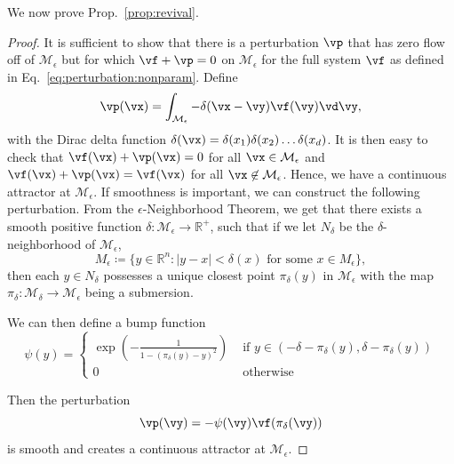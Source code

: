 \documentclass{article} %
\newcounter{ct}
\newcommand{\reals}{\mathbb{R}}
\newcommand{\manifold}{\mathcal{M}}
\theoremstyle{definition}
\theoremstyle{remark}
\newtheorem{remark}{Remark}
\begin{document}
We now prove  Prop.~\ref{prop:revival}.
\begin{proof}%
It is sufficient to show that there is a perturbation \(\vp\) that has zero flow off of \(\manifold_\epsilon\) but for which \(\vf+\vp=0\) on \(\manifold_\epsilon\) for the full system \(\vf\)  as defined in Eq.~\ref{eq:perturbation:nonparam}.
Define
\[\vp(\vx) = \int_{\manifold_\epsilon} - \delta(\vx-\vy)\vf(\vy)\vd\vy,\]
 with the Dirac delta function \(\delta(\vx)=\delta(x_1)\delta(x_2)\dots\delta(x_d)\).
It is then easy to check that \(\vf(\vx)+\vp(\vx)=0\) for all \(\vx\in\manifold_\epsilon\) and \(\vf(\vx)+\vp(\vx)=\vf(\vx)\) for all \(\vx\not\in\manifold_\epsilon\).
Hence, we have a continuous attractor at \(\manifold_\epsilon\).
%
If smoothness is important, we can construct the following perturbation.
From the \(\epsilon\)-Neighborhood Theorem\citep{folland1999real}, we get that  there exists a smooth positive function \(\delta\colon \manifold_\epsilon \rightarrow \reals^+\),
 such that if we let \(N_\delta\) be the
\(\delta\)-neighborhood of \(\manifold_\epsilon\),
\[
M_\epsilon\coloneqq \{y  \in \reals^n : |y - x| < \delta(x) \text{ for some }  x \in M_\epsilon\},
\]
then each \(y\in N_\delta\) possesses a unique closest point \(\pi_\delta(y)\) in \(\manifold_\epsilon\) with the map \(\pi_\delta\colon \manifold_\delta \rightarrow \manifold_\epsilon\) being a submersion.

We can then define a bump function
\begin{equation}
\psi(y) =
\begin{cases}
\exp\left(-\frac{1}{1-(\pi_\delta(y)-y)^2}\right) &\text{  if  } y\in(-\delta-\pi_\delta(y), \delta-\pi_\delta(y))\\
0 & \text{  otherwise }
\end{cases}
\end{equation}

Then the perturbation
\[
\vp(\vy) = - \psi(\vy)\vf(\pi_\delta(\vy))
\]
is smooth and creates a continuous attractor at \(\manifold_\epsilon\).
\end{proof}
\end{document}

